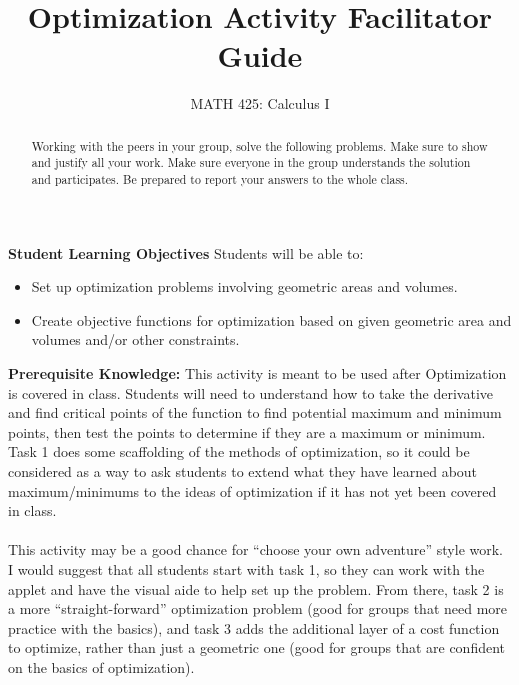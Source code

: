 \documentclass{ximera}
\title{Optimization Activity Facilitator Guide}
\author{MATH 425: Calculus I}
\begin{document}
\begin{abstract}
    Working with the peers in your group, solve the following problems. Make sure to show and justify all your work. Make sure everyone in the group understands the solution and participates. Be prepared to report your answers to the whole class. 
\end{abstract}
\maketitle

\textbf{Student Learning Objectives}
Students will be able to:
\begin{itemize}
    \item Set up optimization problems involving geometric areas and volumes.
    \item Create objective functions for optimization based on given geometric area and volumes and/or other constraints.
\end{itemize}

\textbf{Prerequisite Knowledge:} This activity is meant to be used after Optimization is covered in class. Students will need to understand how to take the derivative and find critical points of the function to find potential maximum and minimum points, then test the points to determine if they are a maximum or minimum.  Task 1 does some scaffolding of the methods of optimization, so it could be considered as a way to ask students to extend what they have learned about maximum/minimums to the ideas of optimization if it has not yet been covered in class. \\
\\

This activity may be a good chance for ``choose your own adventure'' style work.  I would suggest that all students start with task 1, so they can work with the applet and have the visual aide to help set up the problem.  From there, task 2 is a more ``straight-forward'' optimization problem (good for groups that need more practice with the basics), and task 3 adds the additional layer of a cost function to optimize, rather than just a geometric one (good for groups that are confident on the basics of optimization).
\end{document}
